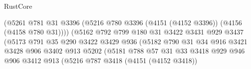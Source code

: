 \begin{lexlean}{RustCore}
\begin{coremodule}
                                        (@5261
                                          @781
                                          @31
                                          @3396
                                          (@5216
                                            @780
                                            @3396
                                            (@4151 (@4152 @3396))
                                            (@4156 (@4158 @780 @31))))
                                        (@5162
                                          @792
                                          @799
                                          @180
                                          @31
                                          @3422
                                          @3431
                                          @929
                                          @3437
                                          (@5173
                                            @791
                                            @35
                                            @290
                                            @3422
                                            @3429
                                            @936
                                            (@5182
                                              @790
                                              @31
                                              @34
                                              @916
                                              @3421
                                              @3428
                                              @906
                                              @3402
                                              @913
                                              @5202
                                              (@5181
                                                @788
                                                @57
                                                @31
                                                @33
                                                @3418
                                                @929
                                                @946
                                                @906
                                                @3412
                                                @913
                                                (@5216
                                                  @787
                                                  @3418
                                                  (@4151 (@4152 @3418))

\end{coremodule}
\end{lexlean}
